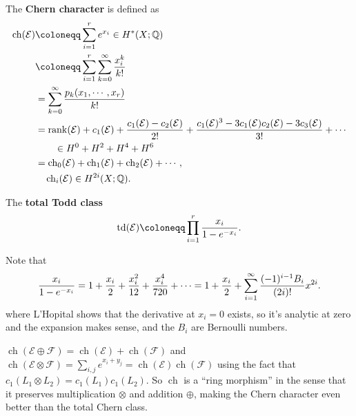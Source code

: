 \begin{definition}

The \textbf{Chern character} is defined as
\begin{align*}
\operatorname{ch}(\mathcal{E}) 
&\coloneqq\sum_{i=1}^r e^{x_i}\in H^*(X; {\mathbb{Q}}) \\
&\coloneqq\sum_{i=1}^r \sum_{k=0}^{\infty } {x_i^k \over k!} \\
&= \sum_{k=0}^{\infty } {p_k(x_1, \cdots, x_r) \over k!} \\
&= \operatorname{rank}(\mathcal{E}) + c_1(\mathcal{E}) + { c_1(\mathcal{E}) - c_2(\mathcal{E}) \over 2!} + { c_1(\mathcal{E})^3 - 3c_1(\mathcal{E}) c_2(\mathcal{E}) - 3 c_3(\mathcal{E}) \over 3!} + \cdots \\
& \qquad \in H^0 + H^2 + H^4 + H^6 \\
&=\operatorname{ch}_0(\mathcal{E}) + \operatorname{ch}_1(\mathcal{E}) + \operatorname{ch}_2( \mathcal{E} ) + \cdots, \\
&   \quad \operatorname{ch}_i(\mathcal{E}) \in H^{2i}(X; {\mathbb{Q}}) 
.\end{align*}

\end{definition}

\begin{definition}

The \textbf{total Todd class}
\begin{align*}
\mathrm{td}(\mathcal{E})
\coloneqq
\prod_{i=1}^r { x_i \over 1 - e^{-x_i} }
.\end{align*}

Note that
\begin{align*}
{x_i \over 1 - e^{-x_i} } = 1 + {x_i \over 2} + {x_i^2 \over 12} + {x_i^4 \over 720} + \cdots = 1 + {x_i \over 2} + \sum_{i=1}^{\infty } { (-1)^{i-1} B_i \over (2i)! } x^{2i}
.\end{align*}
where L'Hopital shows that the derivative at \(x_i = 0\) exists, so it's
analytic at zero and the expansion makes sense, and the \(B_i\) are
Bernoulli numbers.

\end{definition}

\begin{remark}

\(\operatorname{ch}(\mathcal{E} \oplus \mathcal{F}) = \operatorname{ch}(\mathcal{E}) + \operatorname{ch}(\mathcal{F})\)
and
\(\operatorname{ch}( \mathcal{E} \otimes\mathcal{F} ) = \sum_{i,j} e^{x_i + y_j} = \operatorname{ch}( \mathcal{E} ) \operatorname{ch}(\mathcal{F} )\)
using the fact that \(c_1(L_1 \otimes L_2) = c_1(L_1) c_1(L_2)\). So
\(\operatorname{ch}\) is a ``ring morphism'' in the sense that it
preserves multiplication \(\otimes\) and addition \(\oplus\), making the
Chern character even better than the total Chern class.

\end{remark}

